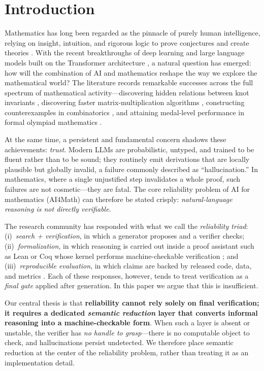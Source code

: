 \documentclass[11pt,a4paper]{article}
\theoremstyle{definition}
\theoremstyle{plain}
\begin{document}
\section{Introduction}
\label{sec:intro}

Mathematics has long been regarded as the pinnacle of purely human intelligence, relying on insight,
intuition, and rigorous logic to prove conjectures and create theories
\cite{chen2025reshaping}. With the recent breakthroughs of deep learning and large language models
built on the Transformer architecture \cite{vaswani2017}, a
natural question has emerged: how will the combination of AI and mathematics reshape the way we explore
the mathematical world? The literature records remarkable successes across the full spectrum of
mathematical activity---discovering hidden relations between knot invariants \cite{davies2021},
discovering faster matrix-multiplication algorithms \cite{fawzi2022}, constructing counterexamples in
combinatorics \cite{wagner2021}, and attaining medal-level performance in formal olympiad
mathematics \cite{trinh2024,hubert2026,chervonyi2025}.

At the same time, a persistent and fundamental concern shadows these achievements: \emph{trust}.
Modern LLMs are probabilistic, untyped, and trained to be fluent rather than to be sound; they routinely
emit derivations that are locally plausible but globally invalid, a failure commonly described as
``hallucination.'' In mathematics, where a single unjustified step invalidates a whole proof, such
failures are not cosmetic---they are fatal. The core reliability problem of AI for mathematics
(AI4Math) can therefore be stated crisply: \emph{natural-language reasoning is not directly
verifiable.}

The research community has responded with what we call the \emph{reliability triad}:
(i)~\emph{search + verification}, in which a generator proposes and a verifier checks;
(ii)~\emph{formalization}, in which reasoning is carried out inside a proof assistant such as Lean or
Coq whose kernel performs machine-checkable verification \cite{moura2021,polu2020,hubert2026}; and
(iii)~\emph{reproducible evaluation}, in which claims are backed by released code, data, and metrics
\cite{cobbe2021,hendrycks2021}. Each of these responses, however, tends to treat verification as a
\emph{final gate} applied after generation. In this paper we argue that this is insufficient.

Our central thesis is that \textbf{reliability cannot rely solely on final verification; it requires a
dedicated \emph{semantic reduction} layer that converts informal reasoning into a machine-checkable
form}. When such a layer is absent or unstable, the verifier has \emph{no handle to grasp}---there is no
computable object to check, and hallucinations persist undetected. We therefore place semantic reduction
at the center of the reliability problem, rather than treating it as an implementation detail.
\end{document}

